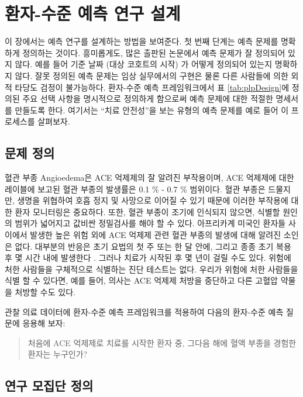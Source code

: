 \documentclass[11pt]{book}
\theoremstyle{definition}
\theoremstyle{definition}
\theoremstyle{definition}
\theoremstyle{remark}
\begin{document}
\section{환자-수준 예측 연구 설계}\label{----}

이 장에서는 예측 연구를 설계하는 방법을 보여준다. 첫 번째 단계는 예측
문제를 명확하게 정의하는 것이다. 흥미롭게도, 많은 출판된 논문에서 예측
문제가 잘 정의되어 있지 않다. 예를 들어 기준 날짜 (대상 코호트의 시작)
가 어떻게 정의되어 있는지 명확하지 않다. 잘못 정의된 예측 문제는 임상
실무에서의 구현은 물론 다른 사람들에 의한 외적 타당도 검정이 불가능하다.
환자-수준 예측 프레임워크에서 표 \ref{tab:plpDesign}에 정의된 주요 선택
사항을 명시적으로 정의하게 함으로써 예측 문제에 대한 적절한 명세서를
만들도록 한다. 여기서는 ``치료 안전성''을 보는 유형의 예측 문제를 예로
들어 이 프로세스를 살펴보자. 

\subsection{문제 정의}\label{--3}

혈관 부종 Angioedema은 ACE 억제제의 잘 알려진 부작용이며, ACE 억제제에
대한 레이블에 보고된 혈관 부종의 발생률은 0.1 \% - 0.7 \% 범위이다.
\citep{byrd_2006} 혈관 부종은 드물지만, 생명을 위협하여 호흡 정지 및
사망으로 이어질 수 있기 때문에 이러한 부작용에 대한 환자 모니터링은
중요하다. \citep{norman_2013} 또한, 혈관 부종이 조기에 인식되지 않으면,
식별할 원인의 범위가 넓어지고 값비싼 정밀검사를 해야 할 수 있다.
\citep{norman_2013, thompson_1993} 아프리카계 미국인 환자들 사이에서
발생한 높은 위험 외에 ACE 억제제 관련 혈관 부종의 발생에 대해 알려진
소인은 없다. \citep{byrd_2006} 대부분의 반응은 초기 요법의 첫 주 또는 한
달 안에, 그리고 종종 초기 복용 후 몇 시간 내에 발생한다
\citep{circardi_2004}. 그러나 치료가 시작된 후 몇 년이 걸릴 수도 있다.
\citep{mara_1996} 위험에 처한 사람들을 구체적으로 식별하는 진단 테스트는
없다. 우리가 위험에 처한 사람들을 식별 할 수 있다면, 예를 들어, 의사는
ACE 억제제 처방을 중단하고 다른 고혈압 약물을 처방할 수도
있다. 

관찰 의료 데이터에 환자-수준 예측 프레임워크를 적용하여 다음의 환자-수준
예측 질문에 응용해 보자:

\begin{quote}
처음에 ACE 억제제로 치료를 시작한 환자 중, 그다음 해에 혈액 부종을
경험한 환자는 누구인가?
\end{quote}

\subsection{연구 모집단 정의}\label{--}
\end{document}
